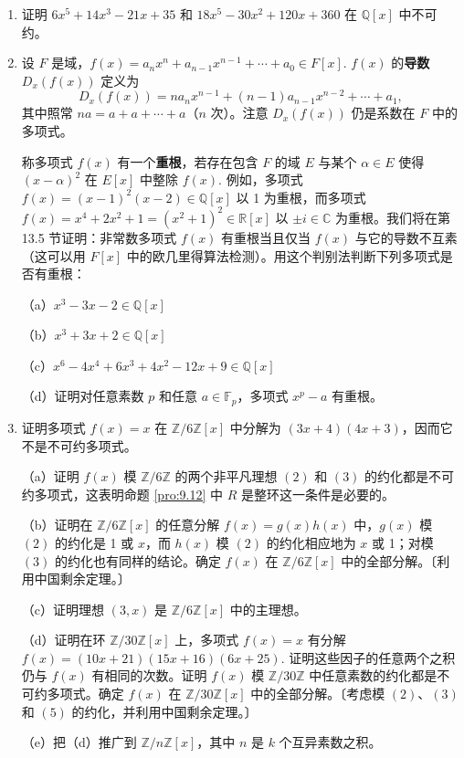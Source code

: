 \begin{enumerate}
\item 证明 \(6x^5+14x^3-21x+35\) 和 \(18x^5-30x^2+120x+360\) 在 \(\mathbb{Q}[x]\) 中不可约。

\item 设 \(F\) 是域，\(f(x) = a_nx^n + a_{n-1}x^{n-1} + \cdots + a_0 \in F[x]\). \(f(x)\) 的\textbf{导数} \(D_x(f(x))\) 定义为
\[
D_x(f(x)) = na_nx^{n-1} + (n-1)a_{n-1}x^{n-2} + \cdots + a_1,
\]
其中照常 \(na = a + a + \cdots + a\)（\(n\) 次）。注意 \(D_x(f(x))\) 仍是系数在 \(F\) 中的多项式。

称多项式 \(f(x)\) 有一个\textbf{重根}，若存在包含 \(F\) 的域 \(E\) 与某个 \(\alpha \in E\) 使得 \((x-\alpha)^2\) 在 \(E[x]\) 中整除 \(f(x)\). 例如，多项式 \(f(x) = (x-1)^2(x-2) \in \mathbb{Q}[x]\) 以 1 为重根，而多项式 \(f(x) = x^4+2x^2+1 = (x^2+1)^2 \in \mathbb{R}[x]\) 以 \(\pm i \in \mathbb{C}\) 为重根。我们将在第 13.5 节证明：非常数多项式 \(f(x)\) 有重根当且仅当 \(f(x)\) 与它的导数不互素（这可以用 \(F[x]\) 中的欧几里得算法检测）。用这个判别法判断下列多项式是否有重根：

（a）\(x^3-3x-2 \in \mathbb{Q}[x]\)

（b）\(x^3+3x+2 \in \mathbb{Q}[x]\)

（c）\(x^6-4x^4+6x^3+4x^2-12x+9 \in \mathbb{Q}[x]\)

（d）证明对任意素数 \(p\) 和任意 \(a \in \mathbb{F}_p\)，多项式 \(x^p-a\) 有重根。

\item 证明多项式 \(f(x) = x\) 在 \(\mathbb{Z}/6\mathbb{Z}[x]\) 中分解为 \((3x+4)(4x+3)\)，因而它不是不可约多项式。

（a）证明 \(f(x)\) 模 \(\mathbb{Z}/6\mathbb{Z}\) 的两个非平凡理想 \((2)\) 和 \((3)\) 的约化都是不可约多项式，这表明命题 \ref{pro:9.12} 中 \(R\) 是整环这一条件是必要的。

（b）证明在 \(\mathbb{Z}/6\mathbb{Z}[x]\) 的任意分解 \(f(x) = g(x)h(x)\) 中，\(g(x)\) 模 \((2)\) 的约化是 1 或 \(x\)，而 \(h(x)\) 模 \((2)\) 的约化相应地为 \(x\) 或 1；对模 \((3)\) 的约化也有同样的结论。确定 \(f(x)\) 在 \(\mathbb{Z}/6\mathbb{Z}[x]\) 中的全部分解。〔利用中国剩余定理。〕

（c）证明理想 \((3, x)\) 是 \(\mathbb{Z}/6\mathbb{Z}[x]\) 中的主理想。

（d）证明在环 \(\mathbb{Z}/30\mathbb{Z}[x]\) 上，多项式 \(f(x) = x\) 有分解 \(f(x) = (10x+21)(15x+16)(6x+25)\). 证明这些因子的任意两个之积仍与 \(f(x)\) 有相同的次数。证明 \(f(x)\) 模 \(\mathbb{Z}/30\mathbb{Z}\) 中任意素数的约化都是不可约多项式。确定 \(f(x)\) 在 \(\mathbb{Z}/30\mathbb{Z}[x]\) 中的全部分解。〔考虑模 \((2)\)、\((3)\) 和 \((5)\) 的约化，并利用中国剩余定理。〕

（e）把（d）推广到 \(\mathbb{Z}/n\mathbb{Z}[x]\)，其中 \(n\) 是 \(k\) 个互异素数之积。
\end{enumerate}

